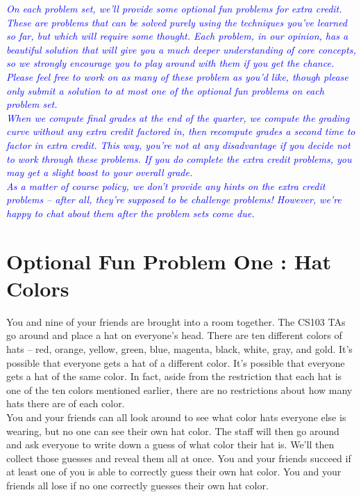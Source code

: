 \documentclass{article}
\renewcommand{\(}{\left(}
\renewcommand{\)}{\right)}
\newcommand{\annotate}[1]{\textit{\textcolor{blue}{#1}}}
\theoremstyle{plain}
\theoremstyle{plain}
\theoremstyle{definition}
\begin{document}
\pagebreak

\annotate{On each problem set, we'll provide some optional fun problems for extra credit. These are problems that can be solved purely using the techniques you've learned so far, but which will require some thought. Each problem, in our opinion, has a beautiful solution that will give you a much deeper understanding of core concepts, so we strongly encourage you to play around with them if you get the chance. Please feel free to work on as many of these problem as you'd like, though please only submit a solution to at most one of the optional fun problems on each problem set.} \\

\annotate{When we compute final grades at the end of the quarter, we compute the grading curve without any extra credit factored in, then recompute grades a second time to factor in extra credit. This way, you're not at any disadvantage if you decide not to work through these problems. If you do complete the extra credit problems, you may get a slight boost to your overall grade.} \\

\annotate{As a matter of course policy, we don't provide any hints on the extra credit problems -- after all, they're supposed to be challenge problems! However, we're happy to chat about them after the problem sets come due.}

\section*{Optional Fun Problem One : Hat Colors}

You and nine of your friends are brought into a room together. The CS103 TAs go around and place a hat on everyone's head. There are ten different colors of hats -- red, orange, yellow, green, blue, magenta, black, white, gray, and gold. It's possible that everyone gets a hat of a different color. It's possible that everyone gets a hat of the same color. In fact, aside from the restriction that each hat is one of the ten colors mentioned earlier, there are no restrictions about how many hats there are of each color. \\

You and your friends can all look around to see what color hats everyone else is wearing, but no one can see their own hat color. The staff will then go around and ask everyone to write down a guess of what color their hat is. We'll then collect those guesses and reveal them all at once. You and your friends succeed if at least one of you is able to correctly guess their own hat color. You and your friends all lose if no one correctly guesses their own hat color. \\
\end{document}
